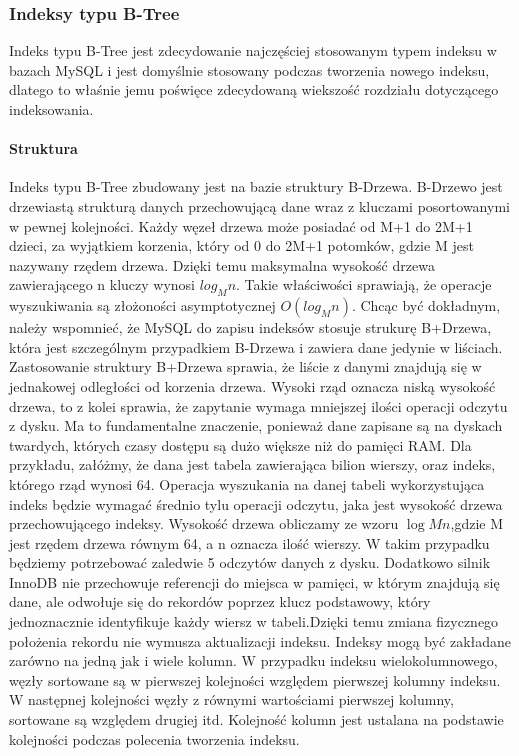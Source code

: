\subsubsection{Indeksy typu B-Tree}
Indeks typu B-Tree jest zdecydowanie najczęściej stosowanym typem indeksu w bazach MySQL i jest domyślnie stosowany podczas tworzenia nowego indeksu, dlatego to właśnie jemu poświęce zdecydowaną wiekszość rozdziału dotyczącego indeksowania.

\paragraph{Struktura}\mbox{}

Indeks typu B-Tree zbudowany jest na bazie struktury B-Drzewa. B-Drzewo jest drzewiastą strukturą danych przechowującą dane wraz z kluczami posortowanymi w pewnej kolejności. Każdy węzeł drzewa może posiadać od M+1 do 2M+1 dzieci, za wyjątkiem korzenia, który od 0 do 2M+1 potomków, gdzie M jest nazywany rzędem drzewa. Dzięki temu maksymalna wysokość drzewa zawierającego n kluczy wynosi $log_M n$. Takie właściwości sprawiają, że operacje wyszukiwania są złożoności asymptotycznej $O(log_M n)$. Chcąc być dokładnym, należy wspomnieć, że MySQL do zapisu indeksów stosuje strukurę B+Drzewa, która jest szczególnym przypadkiem B-Drzewa i zawiera dane jedynie w liściach.
Zastosowanie struktury B+Drzewa sprawia, że liście z danymi znajdują się w jednakowej odległości od korzenia drzewa. Wysoki rząd oznacza niską wysokość drzewa, to z kolei sprawia, że zapytanie wymaga mniejszej ilości operacji odczytu z dysku. Ma to fundamentalne znaczenie, ponieważ dane zapisane są na dyskach twardych, których czasy dostępu są dużo większe niż do pamięci RAM. Dla przykładu, załóżmy, że dana jest tabela zawierająca bilion wierszy, oraz indeks, którego rząd wynosi 64. Operacja wyszukania na danej tabeli wykorzystująca indeks będzie wymagać średnio tylu operacji odczytu, jaka jest wysokość drzewa przechowującego indeksy. Wysokość drzewa obliczamy ze wzoru $\log M n$,gdzie M jest rzędem drzewa równym 64, a n oznacza ilość wierszy. W takim przypadku będziemy potrzebować zaledwie 5 odczytów danych z dysku. Dodatkowo silnik InnoDB nie przechowuje referencji do miejsca w pamięci, w którym znajdują się dane, ale odwołuje się do rekordów poprzez klucz podstawowy, który jednoznacznie identyfikuje każdy wiersz w tabeli.Dzięki temu zmiana fizycznego położenia rekordu nie wymusza aktualizacji indeksu. Indeksy mogą być zakładane zarówno na jedną jak i wiele kolumn. W przypadku indeksu wielokolumnowego, węzły sortowane są w pierwszej kolejności względem pierwszej kolumny indeksu. W następnej kolejności węzły z równymi wartościami pierwszej kolumny, sortowane są względem drugiej itd. Kolejność kolumn jest ustalana na podstawie kolejności podczas polecenia tworzenia indeksu.

